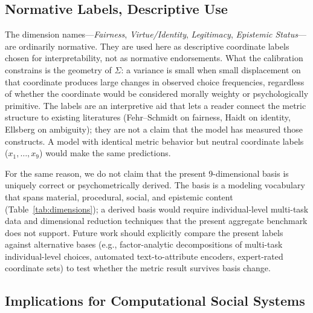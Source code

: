 \documentclass[journal]{IEEEtran}
\begin{document}
\subsection{Normative Labels, Descriptive Use}
\label{sec:descriptive-labels}

The dimension names---\emph{Fairness}, \emph{Virtue/Identity}, \emph{Legitimacy}, \emph{Epistemic Status}---are ordinarily normative.
They are used here as descriptive coordinate labels chosen for interpretability, not as normative endorsements.
What the calibration constrains is the geometry of $\Sigma$: a variance is small when small displacement on that coordinate produces large changes in observed choice frequencies, regardless of whether the coordinate would be considered morally weighty or psychologically primitive.
The labels are an interpretive aid that lets a reader connect the metric structure to existing literatures (Fehr--Schmidt on fairness, Haidt on identity, Ellsberg on ambiguity); they are not a claim that the model has measured those constructs.
A model with identical metric behavior but neutral coordinate labels ($x_1,\dots,x_9$) would make the same predictions.

For the same reason, we do not claim that the present 9-dimensional basis is uniquely correct or psychometrically derived.
The basis is a modeling vocabulary that spans material, procedural, social, and epistemic content (Table~\ref{tab:dimensions}); a derived basis would require individual-level multi-task data and dimensional reduction techniques that the present aggregate benchmark does not support.
Future work should explicitly compare the present labels against alternative bases (e.g., factor-analytic decompositions of multi-task individual-level choices, automated text-to-attribute encoders, expert-rated coordinate sets) to test whether the metric result survives basis change.

\subsection{Implications for Computational Social Systems}
\end{document}
